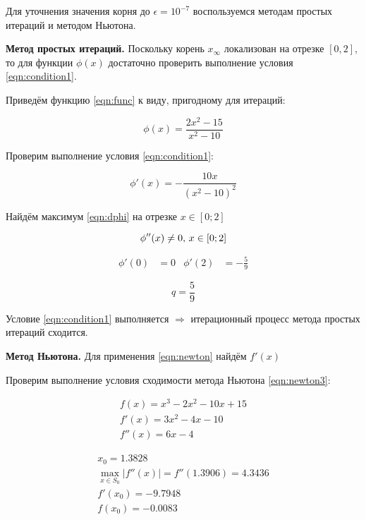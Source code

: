 \documentclass[12pt, a4paper]{article}
\begin{document}
 	Для уточнения значения корня до $\epsilon = 10^{-7}$ воспользуемся методам простых итераций и методом Ньютона.
 	
 	\textbf{Метод простых итераций.} Поскольку корень $x_\infty$ локализован на отрезке $[0,2]$, то для функции $\phi(x)$ достаточно проверить выполнение условия \eqref{eqn:condition1}.
 	
 	Приведём функцию \eqref{eqn:func} к виду, пригодному для итераций:
 	
 	
 	\begin{equation} \label{eqn:phi}
 		\phi(x) = \frac{2 x^2 - 15}{x^2 - 10}
 	\end{equation}
 	
 	Проверим выполнение условия \eqref{eqn:condition1}:
 	
 	\begin{equation} \label{eqn:dphi}
 		\phi ' (x) = - \frac{10 x}{(x^2 - 10)^2}
 	\end{equation}
 	
 	Найдём максимум \eqref{eqn:dphi} на отрезке $x \in [0;2]$
 	
 	\begin{equation}
 		\phi '' (x) \ne 0 , \, x\in [0;2] \\
 	\end{equation}
 	
 	\begin{align}
 		 \phi'(0) &= 0 & \phi'(2) &= -\frac{5}{9}
 	\end{align}
 	
 	\begin{equation}
 		q = \frac{5}{9}
 	\end{equation}
 	
 	Условие \eqref{eqn:condition1} выполняется $\Rightarrow$ итерационный процесс метода простых итераций сходится.
 	
 	\textbf{Метод Ньютона.} Для применения \eqref{eqn:newton} найдём $f'(x)$
 	
	Проверим выполнение условия сходимости метода Ньютона \eqref{eqn:newton3}:
	
	
	\begin{gather}
		f(x) = x^3 - 2x^2 - 10x + 15 \\
		f'(x) = 3x^2 - 4x - 10 \\
		f''(x) = 6x - 4
	\end{gather}
	
	\begin{gather}
		x_0 = 1.3828 \\
		\max_{x\in S_0}|f''(x) | = f''(1.3906) = 4.3436 \\
		f'(x_0) = -9.7948 \\
		f(x_0) = -0.0083 \\
	\end{gather}
 	
\end{document}
